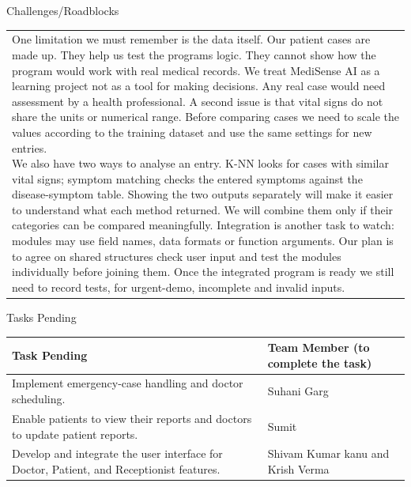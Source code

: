 \documentclass[12pt,a4paper]{article}
\newcommand{\sectiontitle}[1]{%
    {\color{GEUBlue}
    \fontsize{18}{22}\selectfont #1}
}
\newcommand{\answerbox}[2]{%
    \begin{tabularx}{\textwidth}{
        |>{\raggedright\arraybackslash}X|}
        \hline
        \parbox[t][#1][t]{\dimexpr\linewidth-12pt\relax}{
            \vspace{5pt}
            \fontsize{11}{13}\selectfont #2
        }\\
        \hline
    \end{tabularx}
}
\begin{document}
\vspace{0.65cm}

\sectiontitle{Challenges/Roadblocks}

\vspace{0.05cm}
\vspace{0.18cm}

\answerbox{6.5cm}{One limitation we must remember is the data itself. Our patient cases are made up. They help us test the programs logic. They cannot show how the program would work with real medical records. We treat MediSense AI as a learning project not as a tool for making decisions. Any real case would need assessment by a health professional.
A second issue is that vital signs do not share the units or numerical range. Before comparing cases we need to scale the values according to the training dataset and use the same settings for new entries.\\
We also have two ways to analyse an entry. K-NN looks for cases with similar vital signs; symptom matching checks the entered symptoms against the disease-symptom table. Showing the two outputs separately will make it easier to understand what each method returned. We will combine them only if their categories can be compared meaningfully.
Integration is another task to watch: modules may use field names, data formats or function arguments. Our plan is to agree on shared structures check user input and test the modules individually before joining them. Once the integrated program is ready we still need to record tests, for urgent-demo, incomplete and invalid inputs.}

\vspace{0.65cm}

\sectiontitle{Tasks Pending }

\vspace{0.05cm}
\vspace{0.18cm}

\begin{tabularx}{\textwidth}{
|>{\raggedright\arraybackslash}X
|>{\raggedright\arraybackslash}X|}
\hline
\textbf{Task Pending} & \textbf{Team Member (to complete the task)}\\
\hline
Implement emergency-case handling and doctor scheduling.
& Suhani Garg\\
\hline
Enable patients to view their reports and doctors to update patient reports.
& Sumit\\
\hline
Develop and integrate the user interface for Doctor, Patient, and Receptionist features.
& Shivam Kumar kanu and Krish Verma\\
\hline
\end{tabularx}
\end{document}
